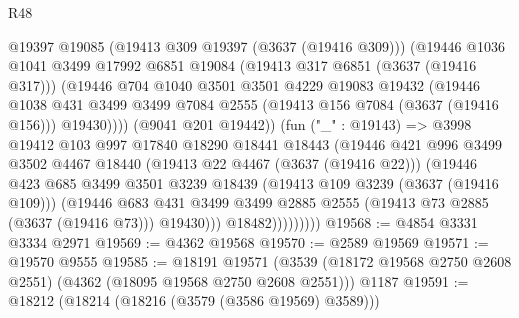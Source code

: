 \begin{lexlean}{R48}
\begin{coremodule}
                        @19397
                        @19085
                        (@19413 @309 @19397 (@3637 (@19416 @309)))
                        (@19446
                          @1036
                          @1041
                          @3499
                          @17992
                          @6851
                          @19084
                          (@19413 @317 @6851 (@3637 (@19416 @317)))
                          (@19446
                            @704
                            @1040
                            @3501
                            @3501
                            @4229
                            @19083
                            @19432
                            (@19446
                              @1038
                              @431
                              @3499
                              @3499
                              @7084
                              @2555
                              (@19413 @156 @7084 (@3637 (@19416 @156)))
                              @19430))))
                      (@9041 @201 @19442))
                    (fun ("_" : @19143) =>
                    @3998
                      @19412
                      @103
                      @997
                      @17840
                      @18290
                      @18441
                      @18443
                      (@19446
                        @421
                        @996
                        @3499
                        @3502
                        @4467
                        @18440
                        (@19413 @22 @4467 (@3637 (@19416 @22)))
                        (@19446
                          @423
                          @685
                          @3499
                          @3501
                          @3239
                          @18439
                          (@19413 @109 @3239 (@3637 (@19416 @109)))
                          (@19446
                            @683
                            @431
                            @3499
                            @3499
                            @2885
                            @2555
                            (@19413 @73 @2885 (@3637 (@19416 @73)))
                            @19430)))
                      @18482)))))))))
@19568 := @4854 @3331 @3334 @2971
@19569 := @4362 @19568
@19570 := @2589 @19569
@19571 := @19570 @9555
@19585 := @18191
    @19571
    (@3539 (@18172 @19568 @2750 @2608 @2551) (@4362 (@18095 @19568 @2750 @2608 @2551)))
    @1187
@19591 := @18212 (@18214 (@18216 (@3579 (@3586 @19569) @3589)))

\end{coremodule}
\end{lexlean}
